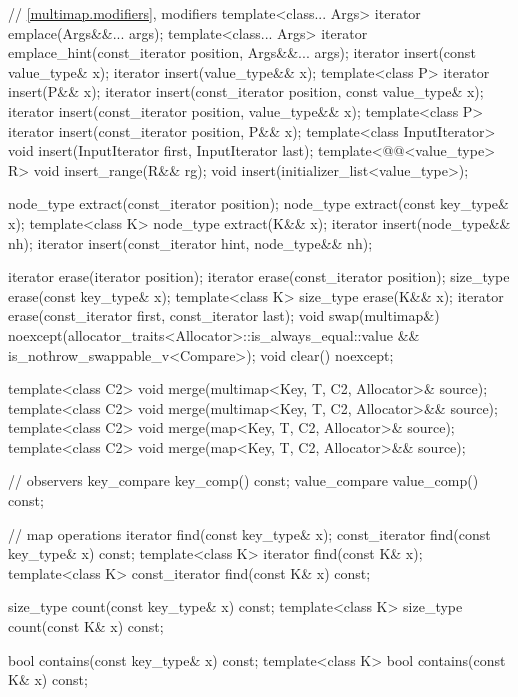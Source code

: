 \begin{codeblock}
{{    // \ref{multimap.modifiers}, modifiers
    template<class... Args> iterator emplace(Args&&... args);
    template<class... Args> iterator emplace_hint(const_iterator position, Args&&... args);
    iterator insert(const value_type& x);
    iterator insert(value_type&& x);
    template<class P> iterator insert(P&& x);
    iterator insert(const_iterator position, const value_type& x);
    iterator insert(const_iterator position, value_type&& x);
    template<class P> iterator insert(const_iterator position, P&& x);
    template<class InputIterator>
      void insert(InputIterator first, InputIterator last);
    template<@@<value_type> R>
      void insert_range(R&& rg);
    void insert(initializer_list<value_type>);

    node_type extract(const_iterator position);
    node_type extract(const key_type& x);
    template<class K> node_type extract(K&& x);
    iterator insert(node_type&& nh);
    iterator insert(const_iterator hint, node_type&& nh);

    iterator  erase(iterator position);
    iterator  erase(const_iterator position);
    size_type erase(const key_type& x);
    template<class K> size_type erase(K&& x);
    iterator  erase(const_iterator first, const_iterator last);
    void      swap(multimap&)
      noexcept(allocator_traits<Allocator>::is_always_equal::value &&
               is_nothrow_swappable_v<Compare>);
    void      clear() noexcept;

    template<class C2>
      void merge(multimap<Key, T, C2, Allocator>& source);
    template<class C2>
      void merge(multimap<Key, T, C2, Allocator>&& source);
    template<class C2>
      void merge(map<Key, T, C2, Allocator>& source);
    template<class C2>
      void merge(map<Key, T, C2, Allocator>&& source);

    // observers
    key_compare key_comp() const;
    value_compare value_comp() const;

    // map operations
    iterator       find(const key_type& x);
    const_iterator find(const key_type& x) const;
    template<class K> iterator       find(const K& x);
    template<class K> const_iterator find(const K& x) const;

    size_type      count(const key_type& x) const;
    template<class K> size_type count(const K& x) const;

    bool           contains(const key_type& x) const;
    template<class K> bool contains(const K& x) const;

}}
\end{codeblock}
